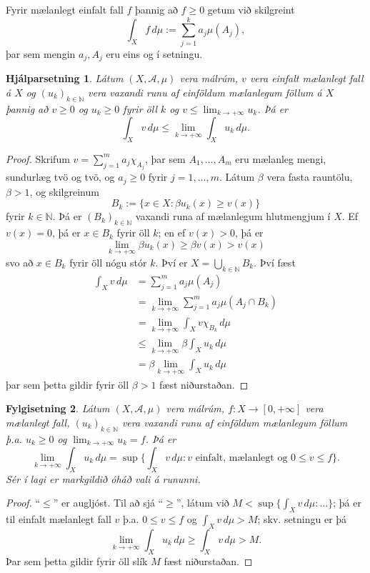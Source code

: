 \documentclass[a4paper,icelandic,11pt]{book}
\theoremstyle{plain}      \newtheorem{setn}{Setning}[chapter]
\newtheorem{lemma}[setn]{Hjálparsetning}
\newtheorem{fylgi}[setn]{Fylgisetning}
\theoremstyle{definition} \newtheorem{skilgr}[setn]{Skilgreining}
\theoremstyle{remark}     \newtheorem*{ath}{Athugasemd}
\newcommand{\N}{\mathbb N}
\begin{document}
Fyrir mælanlegt einfalt fall $f$ þannig að $f\ge 0$ getum við
skilgreint
\[
\int_{X}f\,d\mu := \sum_{j=1}^{k}a_{j}\mu(A_{j}),
\]
þar sem mengin $a_{j},A_{j}$ eru eins og í setningu.
\begin{lemma}
  Látum $(X,\mathcal A,\mu)$ vera málrúm, $v$ vera einfalt mælanlegt
  fall á $X$ og $(u_{k})_{k\in\N}$ vera vaxandi runu af einföldum
  mælanlegum föllum á $X$ þannig að $v\ge 0$ og $u_{k}\ge 0$ fyrir öll
  $k$ og $v\le\lim_{k\to+\infty}u_{k}$. Þá er
  \[
  \int_{X}v\,d\mu \le \lim_{k\to+\infty}\int_{X}u_{k}\,d\mu.
  \]
\end{lemma}
\begin{proof}
  Skrifum $v=\sum_{j=1}^{m}a_{j}\chi_{A_{j}}$, þar sem
  $A_{1},\dots,A_{m}$ eru mælanleg mengi, sundurlæg tvö og tvö, og
  $a_{j}\ge 0$ fyrir $j=1,\dots,m$. Látum $\beta$ vera fasta rauntölu,
  $\beta>1$, og skilgreinum
  \[
  B_{k} := \{ x\in X : \beta u_{k}(x)\ge v(x) \}
  \]
  fyrir $k\in\N$. Þá er $(B_{k})_{k\in\N}$ vaxandi runa af mælanlegum
  hlutmengjum í $X$. Ef $v(x)=0$, þá er $x\in B_{k}$ fyrir öll $k$; en
  ef $v(x)>0$, þá er
  \[
  \lim_{k\to+\infty}\beta u_{k}(x)
  \ge \beta v(x)
  > v(x)
  \]
  svo að $x\in B_{k}$ fyrir öll nógu stór $k$. Því er
  $X=\bigcup_{k\in\N}B_{k}$. Því fæst
  \begin{align*}
    \int_{X}v\,d\mu
    &= \sum_{j=1}^{m}a_{j}\mu(A_{j}) \\
    &= \lim_{k\to+\infty} \sum_{j=1}^{m} a_{j}\mu(A_{j}\cap B_{k}) \\
    &= \lim_{k\to+\infty} \int_{X} v\chi_{B_{k}}\,d\mu \\
    &\le \lim_{k\to+\infty}\beta\int_{X} u_{k}\,d\mu \\
    &= \beta\lim_{k\to+\infty}\int_{X}u_{k}\,d\mu
  \end{align*}
  þar sem þetta gildir fyrir öll $\beta>1$ fæst niðurstaðan.
\end{proof}
\begin{fylgi}
  Látum $(X,\mathcal A,\mu)$ vera málrúm, $f:X\to[0,+\infty]$ vera
  mælanlegt fall, $(u_{k})_{k\in\N}$ vera vaxandi runu af einföldum
  mælanlegum föllum þ.a. $u_{k}\ge 0$ og
  $\lim_{k\to+\infty}u_{k}=f$. Þá er
  \[
  \lim_{k\to+\infty}\int_{X}u_{k}\,d\mu
  = \sup \{ \int_{X} v\,d\mu : v\text{ einfalt, mælanlegt og }
  0 \le v\le f \}.
  \]
  Sér í lagi er markgildið óháð vali á rununni.
\end{fylgi}
\begin{proof}
  ``$\le$'' er augljóst. Til að sjá ``$\ge$'', látum við
  $M<\sup\{\int_{X}v\,d\mu : \dots \}$; þá er til einfalt mælanlegt
  fall $v$ þ.a. $0\le v \le f$ og $\int_{X}v\,d\mu>M$; skv. setningu
  er þá
  \[
  \lim_{k\to+\infty}\int_{X}u_{k}\,d\mu
  \ge\int_{X}v\,d\mu
  > M.
  \]
  Þar sem þetta gildir fyrir öll slík $M$ fæst niðurstaðan.
\end{proof}
\end{document}
